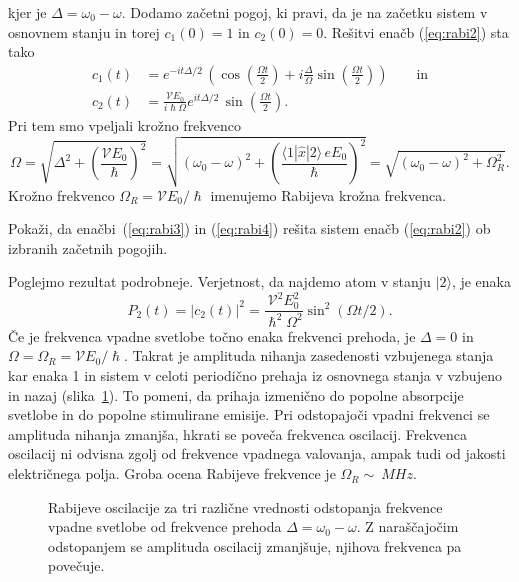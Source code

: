 kjer je $\Delta = \omega_0-\omega$. Dodamo začetni pogoj, ki pravi, da je na začetku
sistem v osnovnem stanju in torej $c_1(0)=1$ in $c_2(0)=0$. Rešitvi enačb
(\ref{eq:rabi2}) sta tako
\begin{align}
c_1(t)&=e^{-it\Delta/2}\, \left(\cos\left(\frac{\Omega t}{2}\right) + 
i \frac{\Delta}{\Omega} \sin\left(\frac{\Omega t}{2}\right) \right)\qquad \mathrm{in} 
\label{eq:rabi3} \\
c_2(t)&=\frac{\mathcal{V}E_0}{i\hslash \Omega} e^{it\Delta/2}\, \sin\left(\frac{\Omega t}{2}\right).
\label{eq:rabi4}
\end{align}
Pri tem smo vpeljali krožno frekvenco
\begin{equation}
\Omega = \sqrt{\Delta^2 + \left(\frac{\mathcal{V}E_0}{\hslash}\right)^2} = \sqrt{(\omega_0-\omega)^2 
+ \left(\frac{\langle1|\hat{x}|2\rangle\, eE_0}{\hslash}\right)^2} = 
\sqrt{(\omega_0-\omega)^2 + \Omega_R^2}.
\end{equation}
Krožno frekvenco $\Omega_R = \mathcal{V} E_0/\hslash$ imenujemo Rabijeva krožna frekvenca.

\begin{definition}
Pokaži, da enačbi~(\ref{eq:rabi3}) in (\ref{eq:rabi4}) rešita
sistem enačb (\ref{eq:rabi2}) ob izbranih začetnih pogojih.
\end{definition}
Poglejmo rezultat podrobneje. Verjetnost, da najdemo atom v stanju $|2\rangle$, je enaka
\begin{equation}
P_2(t) = |c_2(t)|^2 = \frac{\mathcal{V}^2E_0^2}{\hslash^2 \Omega^2}\sin^2(\Omega t/2).
\end{equation}
Če je frekvenca vpadne svetlobe točno enaka frekvenci prehoda, je $\Delta = 0$ in 
$\Omega = \Omega_R = \mathcal{V}E_0/\hslash$. Takrat je amplituda nihanja zasedenosti vzbujenega stanja kar enaka 1
in sistem v celoti periodično prehaja iz osnovnega stanja v vzbujeno in nazaj (slika~\ref{fig:Rabi}). To pomeni,
da prihaja izmenično do popolne absorpcije svetlobe in do popolne stimulirane emisije.
Pri odstopajoči vpadni frekvenci se amplituda nihanja zmanjša, hkrati se poveča
frekvenca oscilacij. Frekvenca oscilacij ni odvisna zgolj od frekvence vpadnega valovanja, 
ampak tudi od jakosti električnega polja. Groba ocena
Rabijeve frekvence je $\Omega_R \sim~\si{MHz}$.
\begin{figure}[h]
\centering
\def\svgwidth{100truemm} 

\caption{Rabijeve oscilacije za tri različne vrednosti odstopanja frekvence vpadne
svetlobe od frekvence prehoda $\Delta=\omega_0-\omega$. 
Z naraščajočim odstopanjem se amplituda oscilacij
zmanjšuje, njihova frekvenca pa povečuje.}
\label{fig:Rabi}
\end{figure}

